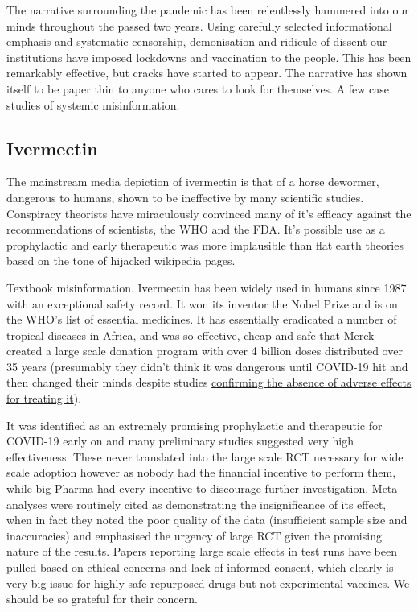 \documentclass[11pt,a4paper]{article}
\begin{document}
The narrative surrounding the pandemic has been relentlessly hammered into our minds throughout the passed two years. Using carefully selected informational emphasis and systematic censorship, demonisation and ridicule of dissent our institutions have imposed lockdowns and vaccination to the people. This has been remarkably effective, but cracks have started to appear. The narrative has shown itself to be paper thin to anyone who cares to look for themselves. A few case studies of systemic misinformation.

\subsection*{Ivermectin}

The mainstream media depiction of ivermectin is that of a horse dewormer, dangerous to humans,  shown to be ineffective by many scientific studies. Conspiracy theorists have miraculously convinced many of it’s efficacy against the recommendations of scientists, the WHO and the FDA. It's possible use as a prophylactic and early therapeutic was more implausible than flat earth theories based on the tone of hijacked wikipedia pages. 

Textbook misinformation. Ivermectin has been widely used in humans since 1987 with an exceptional safety record. It won its inventor the Nobel Prize and is on the WHO’s list of essential medicines. It has essentially eradicated a number of tropical diseases in Africa, and was so effective, cheap and safe that Merck created a large scale donation program with over 4 billion doses distributed over 35 years (presumably they didn't think it was dangerous until COVID-19 hit and then changed their minds despite studies \href{https://academic.oup.com/ofid/article/8/Supplement_1/S365/6450290}{confirming the absence of adverse effects for treating it}). 

It was identified as an extremely promising prophylactic and therapeutic for COVID-19 early on and many preliminary studies suggested very high effectiveness. These never translated into the large scale RCT necessary for wide scale adoption however as nobody had the financial incentive to perform them, while big Pharma had every incentive to discourage further investigation. Meta-analyses were routinely cited as demonstrating the insignificance of its effect, when in fact they noted the poor quality of the data (insufficient sample size and inaccuracies) and emphasised the urgency of large RCT given the promising nature of the results. Papers reporting large scale effects in test runs have been pulled based on \href{https://healthpolicy-watch.news/mexico-city-officials-in-row-over-misleading-paper-to-justify-its-ivermectin-drive/}{ethical concerns and lack of informed consent}, which clearly is very big issue for highly safe repurposed drugs but not experimental vaccines. We should be so grateful for their concern.
\end{document}
